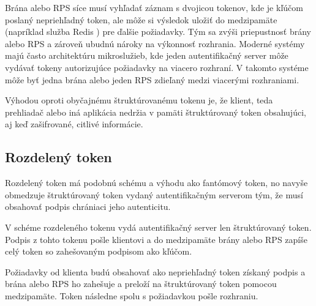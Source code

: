 Brána alebo RPS síce musí vyhľadať záznam s dvojicou tokenov, kde je kľúčom poslaný nepriehľadný token, ale môže si výsledok uložiť do medzipamäte (napríklad služba Redis \cite{redis}) pre ďalšie požiadavky. Tým sa zvýši priepustnosť brány alebo RPS a zároveň ubudnú nároky na výkonnosť rozhrania. Moderné systémy majú často architektúru mikroslužieb, kde jeden autentifikačný server môže vydávať tokeny autorizujúce požiadavky na viacero rozhraní. V takomto systéme môže byť jedna brána alebo jeden RPS zdieľaný medzi viacerými rozhraniami.

Výhodou oproti obyčajnému štruktúrovanému tokenu je, že klient, teda prehliadač alebo iná aplikácia nedržia v pamäti štruktúrovaný token obsahujúci, aj keď zašifrované, citlivé informácie.


\subsection{Rozdelený token}

Rozdelený token \cite{split_token} má podobnú schému a výhodu ako fantómový token, no navyše obmedzuje štruktúrovaný token vydaný autentifikačným serverom tým, že musí obsahovať podpis chrániaci jeho autenticitu.

V schéme rozdeleného tokenu vydá autentifikačný server len štruktúrovaný token. Podpis z tohto tokenu pošle klientovi a do medzipamäte brány alebo RPS zapíše celý token so zahešovaným podpisom ako kľúčom.

Požiadavky od klienta budú obsahovať ako nepriehľadný token získaný podpis a brána alebo RPS ho zahešuje a preloží na štruktúrovaný token pomocou medzipamäte. Token následne spolu s požiadavkou pošle rozhraniu.